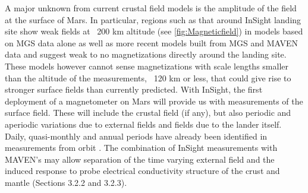 A major unknown from current crustal field models is the amplitude of the field at the surface of Mars.  In particular, regions such as that around InSight landing site show weak fields at ~200 km altitude (see \ref{fig:Magneticfield}) in models based on MGS data alone as well as more recent models built from MGS and MAVEN data \citep{Langlais2010, langlais2017AGU, Mittelholz2016} and suggest weak to no magnetizations directly around the landing site.  These models however cannot sense magnetizations with scale lengths smaller than the altitude of the measurements,  ~120 km or less, that could give rise to stronger surface fields than currently predicted.  With InSight, the first deployment of a magnetometer on Mars will provide us with measurements of the surface field. These will include the crustal field (if any), but also periodic and aperiodic variations due to external fields and fields due to the lander itself. Daily, quasi-monthly and annual periods have already been identified in measurements from orbit \citep{Langlais2017, Mittelholz2017}. The combination of InSight measurements with MAVEN’s  may allow separation of the time varying external field and the induced response to probe electrical conductivity structure of the crust and mantle (Sections 3.2.2 and 3.2.3).

